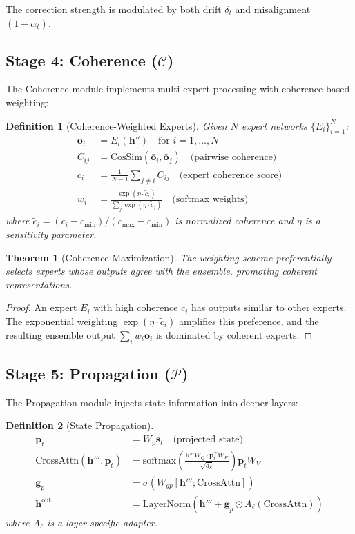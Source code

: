 \documentclass[11pt,a4paper]{article}
\newtheorem{definition}{Definition}
\newtheorem{theorem}{Theorem}
\newcommand{\state}{\mathbf{s}}
\newcommand{\hidden}{\mathbf{h}}
\newcommand{\coherence}{\mathcal{C}}
\newcommand{\prop}{\mathcal{P}}
\begin{document}
The correction strength is modulated by both drift $\delta_t$ and misalignment $(1 - \alpha_t)$.

\subsection{Stage 4: Coherence ($\coherence$)}

The Coherence module implements multi-expert processing with coherence-based weighting:

\begin{definition}[Coherence-Weighted Experts]
Given $N$ expert networks $\{E_i\}_{i=1}^N$:
\begin{align}
\mathbf{o}_i &= E_i(\hidden'') \quad \text{for } i = 1, \ldots, N \\
C_{ij} &= \text{CosSim}(\bar{\mathbf{o}}_i, \bar{\mathbf{o}}_j) \quad \text{(pairwise coherence)} \\
c_i &= \frac{1}{N-1} \sum_{j \neq i} C_{ij} \quad \text{(expert coherence score)} \\
w_i &= \frac{\exp(\eta \cdot \tilde{c}_i)}{\sum_j \exp(\eta \cdot \tilde{c}_j)} \quad \text{(softmax weights)}
\end{align}
where $\tilde{c}_i = (c_i - c_{\min})/(c_{\max} - c_{\min})$ is normalized coherence and $\eta$ is a sensitivity parameter.
\end{definition}

\begin{theorem}[Coherence Maximization]
The weighting scheme preferentially selects experts whose outputs agree with the ensemble, promoting coherent representations.
\end{theorem}

\begin{proof}
An expert $E_i$ with high coherence $c_i$ has outputs similar to other experts. The exponential weighting $\exp(\eta \cdot \tilde{c}_i)$ amplifies this preference, and the resulting ensemble output $\sum_i w_i \mathbf{o}_i$ is dominated by coherent experts.
\end{proof}

\subsection{Stage 5: Propagation ($\prop$)}

The Propagation module injects state information into deeper layers:

\begin{definition}[State Propagation]
\begin{align}
\mathbf{p}_t &= W_p \state_t \quad \text{(projected state)} \\
\text{CrossAttn}(\hidden''', \mathbf{p}_t) &= \text{softmax}\left(\frac{\hidden''' W_Q \cdot \mathbf{p}_t^\top W_K}{\sqrt{d_k}}\right) \mathbf{p}_t W_V \\
\mathbf{g}_p &= \sigma(W_{gp}[\hidden'''; \text{CrossAttn}]) \\
\hidden^{\text{out}} &= \text{LayerNorm}(\hidden''' + \mathbf{g}_p \odot A_\ell(\text{CrossAttn}))
\end{align}
where $A_\ell$ is a layer-specific adapter.
\end{definition}
\end{document}
